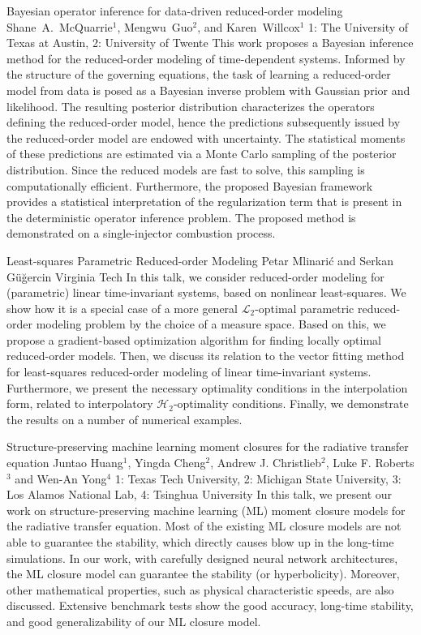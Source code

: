 \begin{addmargin}[2em]{0em}
\vspace{1.5ex}
\abs
{Bayesian operator inference for data-driven reduced-order modeling}
{Shane~A.~McQuarrie$^{1}$, Mengwu~Guo$^{2}$, and Karen~Willcox$^{1}$}
{1: The University of Texas at Austin, 2: University of Twente}
{This work proposes a Bayesian inference method for the reduced-order modeling of time-dependent systems. Informed by the structure of the governing equations, the task of learning a reduced-order model from data is posed as a Bayesian inverse problem with Gaussian prior and likelihood. The resulting posterior distribution characterizes the operators defining the reduced-order model, hence the predictions subsequently issued by the reduced-order model are endowed with uncertainty. The statistical moments of these predictions are estimated via a Monte Carlo sampling of the posterior distribution. Since the reduced models are fast to solve, this sampling is computationally efficient. Furthermore, the proposed Bayesian framework provides a statistical interpretation of the regularization term that is present in the deterministic operator inference problem. The proposed method is demonstrated on a single-injector combustion process.}


\vspace{1.5ex}
\abs
{Least-squares Parametric Reduced-order Modeling}
{Petar Mlinari\'{c} and Serkan G\"{u}\u{g}ercin}
{Virginia Tech}
{In this talk, we consider reduced-order modeling for (parametric) linear time-invariant systems, based on nonlinear least-squares. We show how it is a special case of a more general $\mathcal{L}_2$-optimal parametric reduced-order modeling problem by the choice of a measure space. Based on this, we propose a gradient-based optimization algorithm for finding locally optimal reduced-order models. Then, we discuss its relation to the vector fitting method for least-squares reduced-order modeling of linear time-invariant systems. Furthermore, we present the necessary optimality conditions in the interpolation form, related to interpolatory $\mathcal{H}_2$-optimality conditions. Finally, we demonstrate the results on a number of numerical examples.}


\vspace{1.5ex}
\abs
{Structure-preserving machine learning moment closures for the radiative transfer equation}
{Juntao Huang$^{1}$, Yingda Cheng$^{2}$, Andrew J. Christlieb$^{2}$, Luke F. Roberts$^{3}$ and Wen-An Yong$^{4}$}
{1: Texas Tech University, 2: Michigan State University, 3: Los Alamos National Lab, 4: Tsinghua University}
{In this talk, we present our work on structure-preserving machine learning (ML) moment closure models for the radiative transfer equation. Most of the existing ML closure models are not able to guarantee the stability, which directly causes blow up in the long-time simulations. In our work, with carefully designed neural network architectures, the ML closure model can guarantee the stability (or hyperbolicity). Moreover, other mathematical properties, such as physical characteristic speeds, are also discussed. Extensive benchmark tests show the good accuracy, long-time stability, and good generalizability of our ML closure model.}



\end{addmargin}
